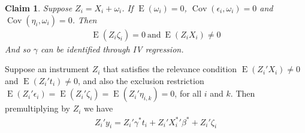 \documentclass[10pt]{article}
\makeatletter
\newtheorem{claim}{Claim}
\renewenvironment{proof}[1][\proofname] {\par\pushQED{\qed}\normalfont\topsep6\p@\@plus6\p@\relax\trivlist\item[\hskip\labelsep\bfseries#1\@addpunct{.}]\ignorespaces}{\popQED\endtrivlist\@endpefalse}
\makeatother
\begin{document}
        \begin{claim}
        Suppose $ Z_i=X_i+\omega_i$. If $\operatorname{E}(\omega_i)=0$, $\operatorname{Cov}(\epsilon_i,\omega_i)=0$ and $\operatorname{Cov}(\eta_i,\omega_i)=0$. Then
        \begin{align*}
        \operatorname{E}(Z_i\zeta_i)=0 \ \text{and} \  \operatorname{E}(Z_iX_i)\neq0
        \end{align*}
        And so $\gamma$ can be identified through IV regression.
        \end{claim}
        \begin{proof}

        Suppose an instrument $Z_i$ that satisfies the relevance condition $\operatorname{E}(Z_i'X_i)\neq 0$ and $\operatorname{E}(Z_i't_i)\neq 0$, and also the exclusion restriction $\operatorname{E}(Z_i'\epsilon_i)=\operatorname{E}(Z_i'\zeta_i)=\operatorname{E}(Z_i'\eta_{i,k})=0$, for all $i$ and $k$. Then premultiplying by $Z_i$ we have
                \begin{align*}
                    Z_i'y_i =  Z_i'\gamma^* t_i +  Z_i'{X^{*}_i}' \beta^* +  Z_i'\zeta_i
                \end{align*}
                

\end{proof}
\end{document}
